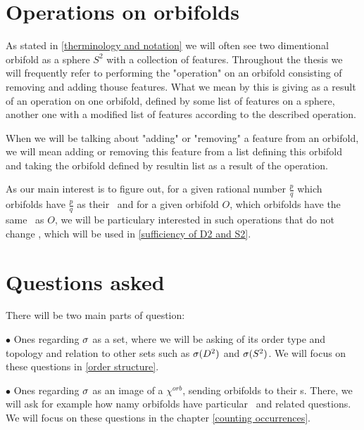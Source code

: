 \section{Operations on orbifolds}\label{Operations}
As stated in \ref{therminology and notation} we will often see two dimentional orbifold 
as a sphere $S^2$ with a collection of features.
Throughout the thesis we will frequently refer to performing the "operation" on an orbifold 
consisting of removing and adding thouse features. 
What we mean by this is giving as a result of an operation on one orbifold, defined 
by some list of features on a sphere, another one 
with a modified list of features according to the described operation. 

When we will be talking about "adding" or "removing" a feature from an orbifold, we 
will mean adding or removing this feature from a list defining this orbifold and 
taking the orbifold defined by resultin list as a result of the operation.
 
As our main interest is to figure out, for a given rational number 
$\frac{p}{q}$ which orbifolds have $\frac{p}{q}$ as their \Eoc\ and for a given 
orbifold $O$, which orbifolds 
have the same \Eoc\ as $O$, we will be particulary interested in such operations 
that do not change \Eoc, which will be used in \ref{sufficiency of D2 and S2}.





\label{moving from interior to boundary}


\section{Questions asked}
There will be two main parts of question: 

$\bullet$ Ones regarding ${\sigma}$ as a set, where we will be asking 
of its order type and topology and relation to other sets such as ${{\sigma}(D^2)}$ and ${{\sigma}(S^2)}$. 
We will focus on these questions in \ref{order structure}. 

$\bullet$ Ones regarding ${\sigma}$ as an image of a $\chi^{orb}$, sending orbifolds to their \Eoc s. 
There, we will ask for example how namy orbifolds have particular \Eoc\ and 
related questions. We will focus on these questions in the chapter \ref{counting occurrences}.  






